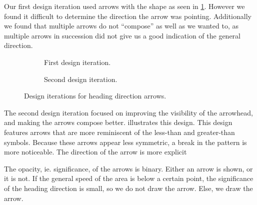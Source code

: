 
Our first design iteration used arrows with the shape as seen in \cref{fig:first_arrow_design}. However we found it difficult to determine the direction the arrow was pointing. Additionally we found that multiple arrows do not \enquote{compose} as well as we wanted to, as multiple arrows in succession did not give us a good indication of the general direction.

\begin{figure}[htbp]
\begin{subfigure}[c]{.49\linewidth}
    \centering
    \caption{First design iteration.}
    \label{fig:first_arrow_design}
\end{subfigure}
%
\begin{subfigure}[c]{.49\linewidth}
    \centering
    \caption{Second design iteration.}
    \label{fig:second_arrow_design}
\end{subfigure}
\caption{Design iterations for heading direction arrows.}
\end{figure}



The second design iteration focused on improving the visibility of the arrowhead, and making the arrows compose better.  illustrates this design. This design features arrows that are more reminiscent of the less-than and greater-than symbols. Because these arrows appear less symmetric, a break in the pattern is more noticeable. The direction of the arrow is more explicit 

The opacity, ie. significance, of the arrows is binary. Either an arrow is shown, or it is not. If the general speed of the area is below a certain point, the significance of the heading direction is small, so we do not draw the arrow. Else, we draw the arrow.

